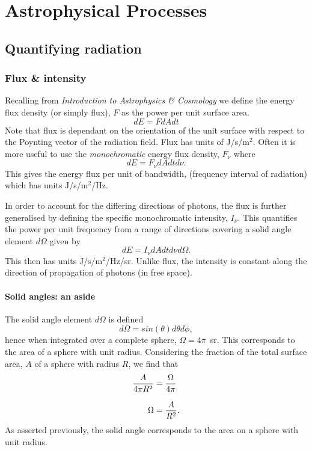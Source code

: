 \chapter{Astrophysical Processes}
\minitoc
\pagebreak
\section{Quantifying radiation}
\subsection{Flux \& intensity}
Recalling from \textit{Introduction to Astrophysics \& Cosmology} we define the energy flux density (or simply flux), $F$ as the power per unit surface area.
%
$$ dE = F dA dt $$
%
Note that flux is dependant on the orientation of the unit surface with respect to the Poynting vector of the radiation field.
 Flux has units of J/s/m$^2$.
 Often it is more useful to use the \emph{monochromatic} energy flux density, $F_\nu$ where
%
$$ dE = F_\nu dA dt d\nu. $$
%
This gives the energy flux per unit of bandwidth, (frequency interval of radiation) which has units J/s/m$^2$/Hz.
\par 
In order to account for the differing directions of photons, the flux is further generalised by defining the specific monochromatic intensity, $I_\nu$.
 This quantifies the power per unit frequency from a range of directions covering a solid angle element $d\Omega$ given by
%
$$ dE = I_\nu dA dt d\nu d\Omega. $$
%
This then has units J/s/m$^2$/Hz/sr.
 Unlike flux, the intensity is constant along the direction of propagation of photons (in free space).
 
\subsubsection{Solid angles: an aside}
The solid angle element $d\Omega$ is defined
%
$$ d\Omega = sin(\theta) d\theta d\phi , $$
%
hence when integrated over a complete sphere, $\Omega = 4\pi$~sr.
 This corresponds to the area of a sphere with unit radius.
 Considering the fraction of the total surface area, $A$ of a sphere with radius $R$, we find that
%
\begin{align*}
	\frac{A}{4\pi R^2} &= \frac{\Omega}{4\pi}
	\\[0.5\baselineskip]
	\Omega &= \frac{A}{R^2}.
\end{align*}
%
As asserted previously, the solid angle corresponds to the area on a sphere with unit radius.
 
 
 
 
 
 
 
 
 
 
 
 